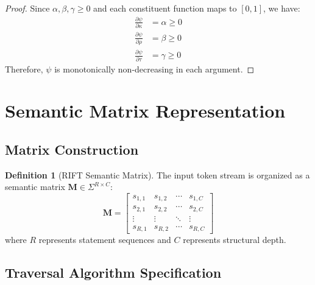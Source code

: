 \documentclass[11pt,a4paper]{article}
\theoremstyle{definition}
\newtheorem{definition}[theorem]{Definition}
\theoremstyle{remark}
\newcommand{\matrix}[1]{\ensuremath{\mathbf{#1}}}
\begin{document}
\begin{proof}
Since $\alpha, \beta, \gamma \geq 0$ and each constituent function maps to $[0,1]$, we have:
\begin{align}
\frac{\partial \psi}{\partial \kappa} &= \alpha \geq 0 \\
\frac{\partial \psi}{\partial \rho} &= \beta \geq 0 \\
\frac{\partial \psi}{\partial \tau} &= \gamma \geq 0
\end{align}
Therefore, $\psi$ is monotonically non-decreasing in each argument.
\end{proof}


\section{Semantic Matrix Representation}
\label{sec:matrix-representation}

\subsection{Matrix Construction}
\label{subsec:matrix-construction}

\begin{definition}[RIFT Semantic Matrix]
The input token stream is organized as a semantic matrix $\matrix{M} \in \Sigma^{R \times C}$:
\begin{equation}
\matrix{M} = \begin{bmatrix}
s_{1,1} & s_{1,2} & \cdots & s_{1,C} \\
s_{2,1} & s_{2,2} & \cdots & s_{2,C} \\
\vdots & \vdots & \ddots & \vdots \\
s_{R,1} & s_{R,2} & \cdots & s_{R,C}
\end{bmatrix}
\end{equation}
where $R$ represents statement sequences and $C$ represents structural depth.
\end{definition}

\subsection{Traversal Algorithm Specification}
\label{subsec:traversal-algorithm}
\end{document}
